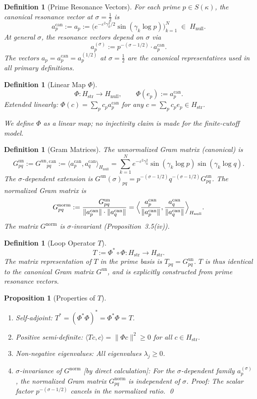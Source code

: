 \documentclass[11pt]{article}
\newtheorem{proposition}[theorem]{Proposition}
\newtheorem{definition}[theorem]{Definition}
\newcommand{\Hstr}{H_{\mathrm{str}}}
\newcommand{\Hnull}{H_{\mathrm{null}}}
\newcommand{\Gun}{G^{\mathrm{un}}}
\newcommand{\Gnorm}{G^{\mathrm{norm}}}
\newcommand{\acan}{a_p^{\mathrm{can}}}
\begin{document}
\begin{definition}[Prime Resonance Vectors]
For each prime $p\in S(\kappa)$, the \emph{canonical resonance vector}
at $\sigma=\tfrac12$ is
\[
\acan := a_p :=
\bigl(e^{-\varepsilon^2\gamma_k^2/2}\sin(\gamma_k\log p)\bigr)_{k=1}^N
\;\in\;\Hnull.
\]
At general $\sigma$, the resonance vectors depend on $\sigma$ via
\[
a_p^{(\sigma)} := p^{-(\sigma-1/2)}\cdot\acan.
\]
The vectors $a_p=\acan=a_p^{(1/2)}$ at $\sigma=\tfrac12$ are the
canonical representatives used in all primary definitions.
\end{definition}

\begin{definition}[Linear Map $\Phi$]
\[
\Phi\colon\Hstr\to\Hnull,\qquad\Phi(e_p):=\acan.
\]
Extended linearly: $\Phi(c)=\sum_p c_p\acan$ for any
$c=\sum_p c_p e_p\in\Hstr$.

\emph{We define $\Phi$ as a linear map; no injectivity claim is made for the
finite-cutoff model.}
\end{definition}

\begin{definition}[Gram Matrices]
The \emph{unnormalized Gram matrix} (canonical) is
\[
\Gun_{pq} := \Gun{}^{\mathrm{,can}}_{pq}
:= \langle\acan,a_q^{\mathrm{can}}\rangle_{\Hnull}
= \sum_{k=1}^N e^{-\varepsilon^2\gamma_k^2}\sin(\gamma_k\log p)\sin(\gamma_k\log q).
\]
The $\sigma$-dependent extension is
$\Gun(\sigma)_{pq}=p^{-(\sigma-1/2)}q^{-(\sigma-1/2)}\Gun_{pq}$.
The \emph{normalized Gram matrix} is
\[
\Gnorm_{pq}:=\frac{\Gun_{pq}}{\|\acan\|\cdot\|a_q^{\mathrm{can}}\|}
=\Bigl\langle\frac{\acan}{\|\acan\|},\frac{a_q^{\mathrm{can}}}{\|a_q^{\mathrm{can}}\|}\Bigr\rangle_{\Hnull}.
\]
The matrix $\Gnorm$ is $\sigma$-invariant (Proposition~3.5(iv)).
\end{definition}

\begin{definition}[Loop Operator $T$]
\[
T:=\Phi^*\circ\Phi\colon\Hstr\longrightarrow\Hstr.
\]
The matrix representation of $T$ in the prime basis is $T_{pq}=\Gun_{pq}$.
$T$ is thus identical to the canonical Gram matrix $\Gun$, and is explicitly
constructed from prime resonance vectors.
\end{definition}

\begin{proposition}[Properties of $T$]
\label{prop:T}
\begin{enumerate}[label=\emph{(\roman*)}, leftmargin=2.2em]
\item \emph{Self-adjoint:} $T^*=(\Phi^*\Phi)^*=\Phi^*\Phi=T$.
\item \emph{Positive semi-definite:} $\langle Tc,c\rangle=\|\Phi c\|^2\geq 0$
for all $c\in\Hstr$.
\item \emph{Non-negative eigenvalues:} All eigenvalues $\lambda_j\geq 0$.
\item \emph{$\sigma$-invariance of $\Gnorm$} [by direct calculation]:
For the $\sigma$-dependent family $a_p^{(\sigma)}$, the normalized Gram matrix
$\Gnorm_{pq}$ is independent of $\sigma$. \emph{Proof:} The scalar factor
$p^{-(\sigma-1/2)}$ cancels in the normalized ratio. \qed
\end{enumerate}
\end{proposition}
\end{document}

